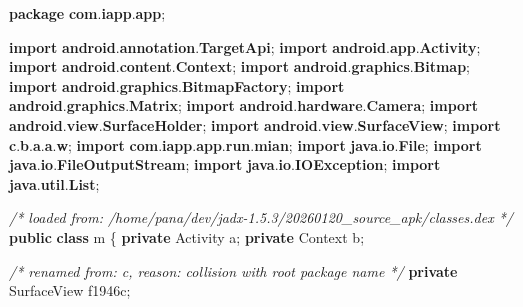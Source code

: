 \documentclass[
]{article}
\newenvironment{Shaded}{}{}
\newcommand{\BuiltInTok}[1]{\textcolor[rgb]{0.00,0.50,0.00}{#1}}
\newcommand{\CommentTok}[1]{\textcolor[rgb]{0.38,0.63,0.69}{\textit{#1}}}
\newcommand{\ImportTok}[1]{\textcolor[rgb]{0.00,0.50,0.00}{\textbf{#1}}}
\newcommand{\KeywordTok}[1]{\textcolor[rgb]{0.00,0.44,0.13}{\textbf{#1}}}
\newcommand{\NormalTok}[1]{#1}
\newcommand{\OperatorTok}[1]{\textcolor[rgb]{0.40,0.40,0.40}{#1}}
\begin{document}
\begin{Shaded}
\begin{Highlighting}[]
\KeywordTok{package}\ImportTok{ com}\OperatorTok{.}\ImportTok{iapp}\OperatorTok{.}\ImportTok{app}\OperatorTok{;}

\KeywordTok{import} \ImportTok{android}\OperatorTok{.}\ImportTok{annotation}\OperatorTok{.}\ImportTok{TargetApi}\OperatorTok{;}
\KeywordTok{import} \ImportTok{android}\OperatorTok{.}\ImportTok{app}\OperatorTok{.}\ImportTok{Activity}\OperatorTok{;}
\KeywordTok{import} \ImportTok{android}\OperatorTok{.}\ImportTok{content}\OperatorTok{.}\ImportTok{Context}\OperatorTok{;}
\KeywordTok{import} \ImportTok{android}\OperatorTok{.}\ImportTok{graphics}\OperatorTok{.}\ImportTok{Bitmap}\OperatorTok{;}
\KeywordTok{import} \ImportTok{android}\OperatorTok{.}\ImportTok{graphics}\OperatorTok{.}\ImportTok{BitmapFactory}\OperatorTok{;}
\KeywordTok{import} \ImportTok{android}\OperatorTok{.}\ImportTok{graphics}\OperatorTok{.}\ImportTok{Matrix}\OperatorTok{;}
\KeywordTok{import} \ImportTok{android}\OperatorTok{.}\ImportTok{hardware}\OperatorTok{.}\ImportTok{Camera}\OperatorTok{;}
\KeywordTok{import} \ImportTok{android}\OperatorTok{.}\ImportTok{view}\OperatorTok{.}\ImportTok{SurfaceHolder}\OperatorTok{;}
\KeywordTok{import} \ImportTok{android}\OperatorTok{.}\ImportTok{view}\OperatorTok{.}\ImportTok{SurfaceView}\OperatorTok{;}
\KeywordTok{import} \ImportTok{c}\OperatorTok{.}\ImportTok{b}\OperatorTok{.}\ImportTok{a}\OperatorTok{.}\ImportTok{a}\OperatorTok{.}\ImportTok{w}\OperatorTok{;}
\KeywordTok{import} \ImportTok{com}\OperatorTok{.}\ImportTok{iapp}\OperatorTok{.}\ImportTok{app}\OperatorTok{.}\ImportTok{run}\OperatorTok{.}\ImportTok{mian}\OperatorTok{;}
\KeywordTok{import} \ImportTok{java}\OperatorTok{.}\ImportTok{io}\OperatorTok{.}\ImportTok{File}\OperatorTok{;}
\KeywordTok{import} \ImportTok{java}\OperatorTok{.}\ImportTok{io}\OperatorTok{.}\ImportTok{FileOutputStream}\OperatorTok{;}
\KeywordTok{import} \ImportTok{java}\OperatorTok{.}\ImportTok{io}\OperatorTok{.}\ImportTok{IOException}\OperatorTok{;}
\KeywordTok{import} \ImportTok{java}\OperatorTok{.}\ImportTok{util}\OperatorTok{.}\ImportTok{List}\OperatorTok{;}

\CommentTok{/* loaded from: /home/pana/dev/jadx{-}1.5.3/20260120\_source\_apk/classes.dex */}
\KeywordTok{public} \KeywordTok{class}\NormalTok{ m }\OperatorTok{\{}
    \KeywordTok{private}\NormalTok{ Activity a}\OperatorTok{;}
    \KeywordTok{private} \BuiltInTok{Context}\NormalTok{ b}\OperatorTok{;}

    \CommentTok{/* renamed from: c, reason: collision with root package name */}
    \KeywordTok{private}\NormalTok{ SurfaceView f1946c}\OperatorTok{;}


\end{Highlighting}
\end{Shaded}
\end{document}
